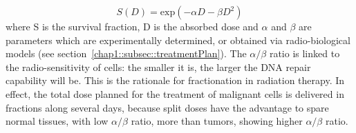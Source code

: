 \begin{equation}
S(D) = \mathrm{exp}(-\alpha D - \beta D^{2})
\label{chap1::eq::survivalPar}
\end{equation}
where S is the survival fraction, D is the absorbed dose and $\alpha$ and $\beta$ are parameters which are experimentally determined, or obtained via radio-biological models (see section~\ref{chap1::subsec::treatmentPlan}). The $\alpha/\beta$ ratio is linked to the radio-sensitivity of cells: the smaller it is, the larger the DNA repair capability will be. This is the rationale for fractionation in radiation therapy. In effect, the total dose planned for the treatment of malignant cells is delivered in fractions along several days, because split doses have the advantage to spare normal tissues, with low $\alpha/\beta$ ratio, more than tumors, showing higher $\alpha/\beta$ ratio. 

